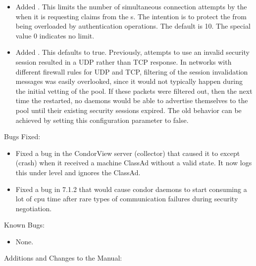 \begin{itemize}

\item Added .  This limits
the number of simultaneous connection attempts by the 
when it is requesting claims from the s.  The intention
is to protect the  from being overloaded by
authentication operations.  The default is 10.  The special value 0
indicates no limit.

\item Added .  This
defaults to true.  Previously, attempts to use an invalid security
session resulted in a UDP rather than TCP response.  In networks with
different firewall rules for UDP and TCP, filtering of the session
invalidation messages was easily overlooked, since it would not
typically happen during the initial vetting of the pool.  If these
packets were filtered out, then the next time the 
restarted, no daemons would be able to advertise themselves to the
pool until their existing security sessions expired.  The old behavior
can be achieved by setting this configuration parameter to false.

\end{itemize}

\noindent Bugs Fixed:

\begin{itemize}

\item Fixed a bug in the CondorView server (collector) that caused it
to except (crash) when it received a machine ClassAd without a valid state.
It now logs this under level  and ignores the ClassAd.

\item Fixed a bug in 7.1.2 that would cause condor daemons to start
consuming a lot of cpu time after rare types of communication failures
during security negotiation.

\end{itemize}

\noindent Known Bugs:

\begin{itemize}

\item None.

\end{itemize}

\noindent Additions and Changes to the Manual:

